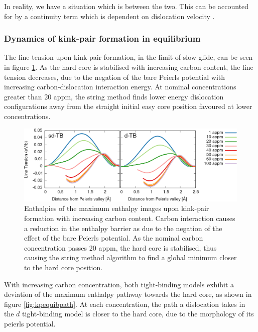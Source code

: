 \documentclass[a4paper,11pt]{article}
\begin{document}
In reality, we have a situation which is between the two. This can be accounted for by
a continuity term which is dependent on dislocation velocity \cite{Gong2020}.

\subsubsection{Dynamics of kink-pair formation in equilibrium}
\label{sec:org64c0477}
\label{sec:kinkpairformationequib}
The line-tension upon kink-pair formation, in the limit of slow glide, can
be seen in figure \ref{fig:kinkpairequib}. As the hard core is stabilised with
increasing carbon content, the line tension decreases, due to the negation
of the bare Peierls potential with increasing carbon-dislocation interaction
energy. At nominal concentrations greater than 20 appm, the string method
finds lower energy dislocation configurations away from the straight initial
easy core position favoured at lower concentrations.

\begin{figure}[htbp]
\centering
\includegraphics[width=1.\textwidth]{Images/kink-pair_equilibrium_combined_moving_sites.png}
\caption{Enthalpies of the maximum enthalpy images upon kink-pair formation with increasing carbon content. Carbon interaction causes a reduction in the enthalpy barrier as due to the negation of the effect of the bare Peierls potential. As the nominal carbon concentration passes 20 appm, the hard core is stabilised, thus causing the string method algorithm to find a global minimum closer to the hard core position. \label{fig:kinkpairequib}}
\end{figure}


With increasing carbon concentration, both tight-binding models exhibit a
deviation of the maximum enthalpy pathway towards the hard core, as shown in figure
\ref{fig:kpequibpath}. At each concentration, the path a dislocation takes in the \(d\)
tight-binding model is closer to the hard core, due to the morphology of its
peierls potential.
\end{document}
